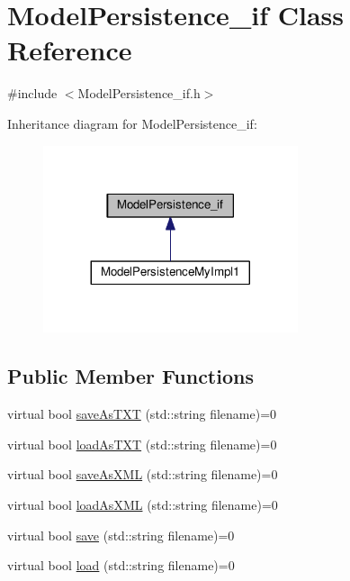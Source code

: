 \hypertarget{class_model_persistence__if}{\section{Model\-Persistence\-\_\-if Class Reference}
\label{class_model_persistence__if}
}


{\ttfamily \#include $<$Model\-Persistence\-\_\-if.\-h$>$}



Inheritance diagram for Model\-Persistence\-\_\-if\-:
\nopagebreak
\begin{figure}[H]
\begin{center}
\leavevmode
\includegraphics[width=212pt]{class_model_persistence__if__inherit__graph}
\end{center}
\end{figure}
\subsection*{Public Member Functions}
\begin{DoxyCompactItemize}
\item 
virtual bool \hyperlink{class_model_persistence__if_a4cabe06b4f610b9237c52208ee6c51bd}{save\-As\-T\-X\-T} (std\-::string filename)=0
\item 
virtual bool \hyperlink{class_model_persistence__if_af1ee016d7810fc3798b5bf013398de7f}{load\-As\-T\-X\-T} (std\-::string filename)=0
\item 
virtual bool \hyperlink{class_model_persistence__if_afb8e1011e873757febfb0d055d592d38}{save\-As\-X\-M\-L} (std\-::string filename)=0
\item 
virtual bool \hyperlink{class_model_persistence__if_a8c44f9b2e917b33812cbaa7c844854c8}{load\-As\-X\-M\-L} (std\-::string filename)=0
\item 
virtual bool \hyperlink{class_model_persistence__if_a960acf977c56ed52a153524c6ed8d4c6}{save} (std\-::string filename)=0
\item 
virtual bool \hyperlink{class_model_persistence__if_a48f90bbb37e106ee4b423075660d5a73}{load} (std\-::string filename)=0
\end{DoxyCompactItemize}


